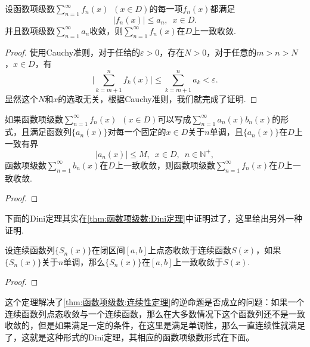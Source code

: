     \begin{theorem}[Weierrstrass判别法]
        设函数项级数\(\sum\limits_{n=1}^{\infty}f_n(x)\enspace (x\in D)\)的每一项\(f_n(x)\)都满足\[\lvert f_n(x)\rvert\leq a_n,\enspace x\in D.\]
        并且数项级数\(\sum\limits_{n=1}^{\infty}a_n\)收敛，则\(\sum\limits_{n=1}^{\infty}f_n(x)\)在\(D\)上一致收敛.
    \end{theorem}
    \begin{proof}
        使用Cauchy准则，对于任给的\(\varepsilon>0\)，存在\(N>0\)，对于任意的\(m>n>N\)，\enspace\(x\in D\)，有\[\lvert\sum_{k=m+1}^{n}f_k(x)\rvert \leq \sum_{k=m+1}^{n}a_k<\varepsilon.\]
        显然这个\(N\)和\(x\)的选取无关，根据Cauchy准则，我们就完成了证明.
    \end{proof}

    \begin{theorem}[Abel判别法]
        如果函数项级数\(\sum\limits_{n=1}^{\infty}f_n(x)\enspace (x\in D)\)可以写成\(\sum\limits_{n=1}^{\infty}a_n(x)b_n(x)\)的形式，且满足函数列\(\{a_n(x)\}\)对每一个固定的\(x\in D\)关于\(n\)单调，且\(\{a_n(x)\}\)在\(D\)上一致有界\[\lvert a_n(x)\rvert\leq M,\enspace x\in D,\enspace n\in\mathbb{N}^{+},\]函数项级数\(\sum\limits_{n=1}^{\infty}b_n(x)\)在\(D\)上一致收敛，则函数项级数\(\sum\limits_{n=1}^{\infty}f_n(x)\)在\(D\)上一致收敛.
    \end{theorem}
    \begin{proof}
        
    \end{proof}

    下面的Dini定理其实在\autoref{thm:函数项级数:Dini定理}中证明过了，这里给出另外一种证明.
    \begin{theorem}[Dini定理]
        设连续函数列\(\{S_n(x)\}\)在闭区间\([a,b]\)上点态收敛于连续函数\(S(x)\)，如果\(\{S_n(x)\}\)关于\(n\)单调，那么\(\{S_n(x)\}\)在\([a,b]\)上一致收敛于\(S(x)\).
    \end{theorem}
    \begin{proof}
        
    \end{proof}
    
    这个定理解决了\autoref{thm:函数项级数:连续性定理}的逆命题是否成立的问题：如果一个连续函数列点态收敛与一个连续函数，那么在大多数情况下这个函数列还不是一致收敛的，但是如果满足一定的条件，在这里是满足单调性，那么一直连续性就满足了，这就是这种形式的Dini定理，其相应的函数项级数形式在下面。

